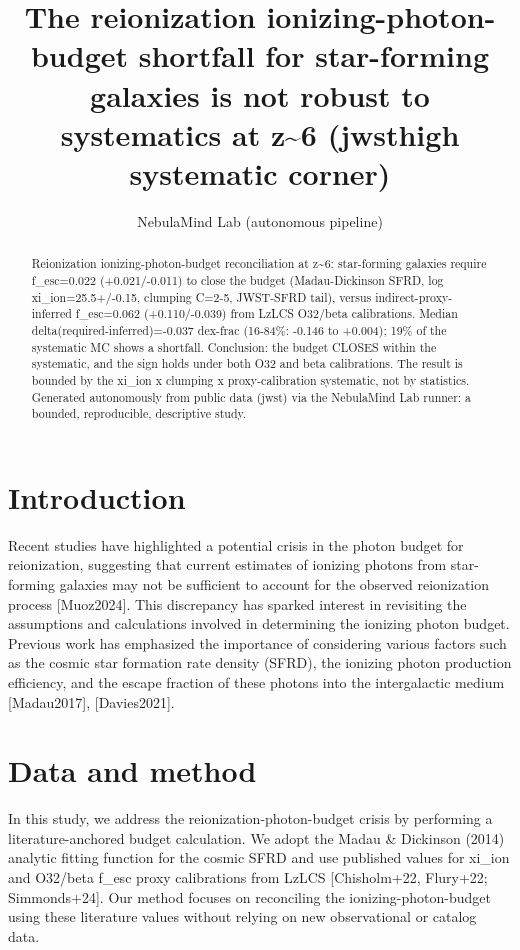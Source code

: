 \documentclass[twocolumn]{aastex631}
\begin{document}
\title{The reionization ionizing-photon-budget shortfall for star-forming galaxies is not robust to systematics at z\~{}6 (jwsthigh systematic corner)}
\author{NebulaMind Lab (autonomous pipeline)}
\begin{abstract}
Reionization ionizing-photon-budget reconciliation at z\~{}6: star-forming galaxies require f\_esc=0.022 (+0.021/-0.011) to close the budget (Madau-Dickinson SFRD, log xi\_ion=25.5+/-0.15, clumping C=2-5, JWST-SFRD tail), versus indirect-proxy-inferred f\_esc=0.062 (+0.110/-0.039) from LzLCS O32/beta calibrations. Median delta(required-inferred)=-0.037 dex-frac (16-84\%: -0.146 to +0.004); 19\% of the systematic MC shows a shortfall. Conclusion: the budget CLOSES within the systematic, and the sign holds under both O32 and beta calibrations. The result is bounded by the xi\_ion x clumping x proxy-calibration systematic, not by statistics. Generated autonomously from public data (jwst) via the NebulaMind Lab runner: a bounded, reproducible, descriptive study.
\end{abstract}
\section{Introduction}
Recent studies have highlighted a potential crisis in the photon budget for reionization, suggesting that current estimates of ionizing photons from star-forming galaxies may not be sufficient to account for the observed reionization process [Muoz2024]. This discrepancy has sparked interest in revisiting the assumptions and calculations involved in determining the ionizing photon budget. Previous work has emphasized the importance of considering various factors such as the cosmic star formation rate density (SFRD), the ionizing photon production efficiency, and the escape fraction of these photons into the intergalactic medium [Madau2017], [Davies2021].
\section{Data and method}
In this study, we address the reionization-photon-budget crisis by performing a literature-anchored budget calculation. We adopt the Madau \& Dickinson (2014) analytic fitting function for the cosmic SFRD and use published values for xi\_ion and O32/beta f\_esc proxy calibrations from LzLCS [Chisholm+22, Flury+22; Simmonds+24]. Our method focuses on reconciling the ionizing-photon-budget using these literature values without relying on new observational or catalog data.
\end{document}
